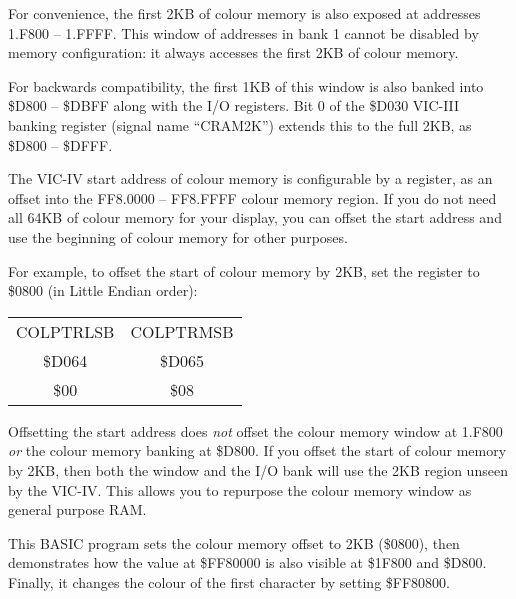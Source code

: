 
For convenience, the first 2KB of colour memory is
also exposed at addresses 1.F800 -- 1.FFFF. This window of addresses in bank 1
cannot be disabled by memory configuration: it always accesses the first 2KB of
colour memory.

For backwards compatibility, the first 1KB of this window is also banked
into \$D800 -- \$DBFF along with the I/O registers. Bit 0 of the \$D030 VIC-III
banking register (signal name ``CRAM2K'') extends this to the full 2KB, as \$D800
-- \$DFFF.

The VIC-IV start address of colour memory is configurable by a register, as an
offset into the FF8.0000 -- FF8.FFFF colour memory region. If you do not need
all 64KB of colour memory for your display, you can offset the start address
and use the beginning of colour memory for other purposes.

For example, to offset the start of colour memory by 2KB, set the register to
\$0800 (in Little Endian order):

\begin{center}
\begin{tabular}{|c|c|}
\hline
COLPTRLSB & COLPTRMSB \\
\$D064 & \$D065 \\
\hline
\$00 & \$08 \\
\hline
\end{tabular}
\end{center}

Offsetting the start address does {\em not} offset the colour memory window at 1.F800
{\em or} the colour memory banking at \$D800. If you offset the start of colour
memory by 2KB, then both the window and the I/O bank will use the 2KB region
unseen by the VIC-IV. This allows you to repurpose the colour memory window as
general purpose RAM.

This BASIC program sets the colour memory offset to 2KB (\$0800), then
demonstrates how the value at \$FF80000 is also visible at \$1F800 and \$D800.
Finally, it changes the colour of the first character by setting \$FF80800.



